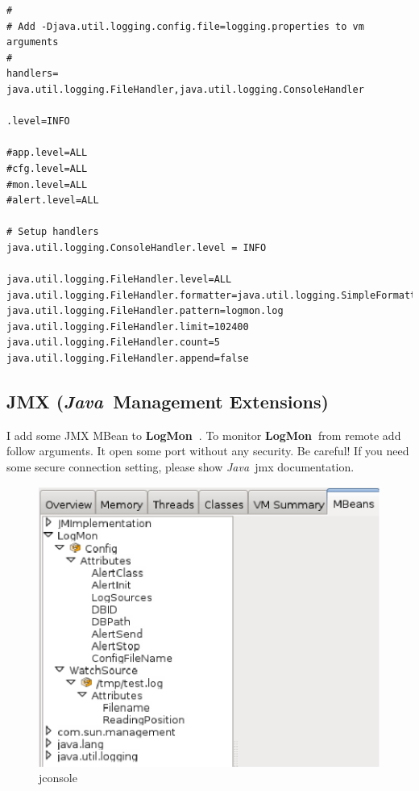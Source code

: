 \documentclass[11pt,a4paper]{article}
\newcommand{\logmon}{\textbf{LogMon\ }}
\newcommand{\java}{\textit{Java\ }}
\begin{document}
\begin{verbatim}
#
# Add -Djava.util.logging.config.file=logging.properties to vm arguments
#
handlers= java.util.logging.FileHandler,java.util.logging.ConsoleHandler

.level=INFO

#app.level=ALL
#cfg.level=ALL
#mon.level=ALL
#alert.level=ALL

# Setup handlers
java.util.logging.ConsoleHandler.level = INFO

java.util.logging.FileHandler.level=ALL
java.util.logging.FileHandler.formatter=java.util.logging.SimpleFormatter
java.util.logging.FileHandler.pattern=logmon.log
java.util.logging.FileHandler.limit=102400
java.util.logging.FileHandler.count=5
java.util.logging.FileHandler.append=false

\end{verbatim}

\subsection{JMX (\java Management Extensions)}

I add some JMX MBean to \logmon. To monitor \logmon from remote add follow
arguments. It open some port without any security. Be careful!
If you need some secure connection setting, please show \java jmx documentation.

\begin{figure}[h]
\centering
\includegraphics{img/jconsole.eps}
\caption{jconsole}
\end{figure}
\end{document}

